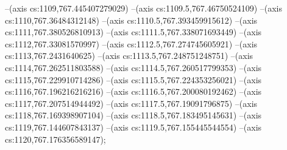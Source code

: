 --(axis cs:1109,767.445407279029)
--(axis cs:1109.5,767.46750524109)
--(axis cs:1110,767.36484312148)
--(axis cs:1110.5,767.393459915612)
--(axis cs:1111,767.380526810913)
--(axis cs:1111.5,767.338071693449)
--(axis cs:1112,767.33081570997)
--(axis cs:1112.5,767.274745605921)
--(axis cs:1113,767.2431640625)
--(axis cs:1113.5,767.248751248751)
--(axis cs:1114,767.262511803588)
--(axis cs:1114.5,767.260517799353)
--(axis cs:1115,767.229910714286)
--(axis cs:1115.5,767.224353256021)
--(axis cs:1116,767.196216216216)
--(axis cs:1116.5,767.200080192462)
--(axis cs:1117,767.207514944492)
--(axis cs:1117.5,767.19091796875)
--(axis cs:1118,767.169398907104)
--(axis cs:1118.5,767.183495145631)
--(axis cs:1119,767.144607843137)
--(axis cs:1119.5,767.155445544554)
--(axis cs:1120,767.176356589147);
